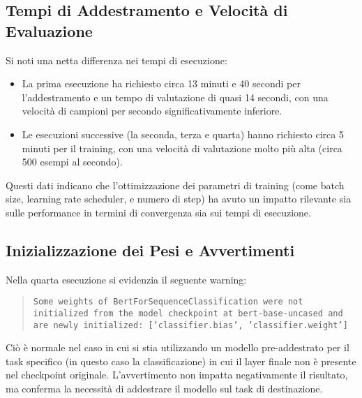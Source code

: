 \documentclass[a4paper,12pt]{article}
\begin{document}
\subsection{Tempi di Addestramento e Velocità di Evaluazione}
Si noti una netta differenza nei tempi di esecuzione:
\begin{itemize}
    \item La prima esecuzione ha richiesto circa 13 minuti e 40 secondi per l’addestramento e un tempo di valutazione di quasi 14 secondi, con una velocità di campioni per secondo significativamente inferiore.
    \item Le esecuzioni successive (la seconda, terza e quarta) hanno richiesto circa 5 minuti per il training, con una velocità di valutazione molto più alta (circa 500 esempi al secondo).  
\end{itemize}
Questi dati indicano che l’ottimizzazione dei parametri di training (come batch size, learning rate scheduler, e numero di step) ha avuto un impatto rilevante sia sulle performance in termini di convergenza sia sui tempi di esecuzione.

\subsection{Inizializzazione dei Pesi e Avvertimenti}
Nella quarta esecuzione si evidenzia il seguente warning:
\begin{quote}
\texttt{Some weights of BertForSequenceClassification were not initialized from the model checkpoint at bert-base-uncased and are newly initialized: ['classifier.bias', 'classifier.weight']}
\end{quote}
Ciò è normale nel caso in cui si stia utilizzando un modello pre-addestrato per il task specifico (in questo caso la classificazione) in cui il layer finale non è presente nel checkpoint originale. L'avvertimento non impatta negativamente il risultato, ma conferma la necessità di addestrare il modello sul task di destinazione.
\end{document}
